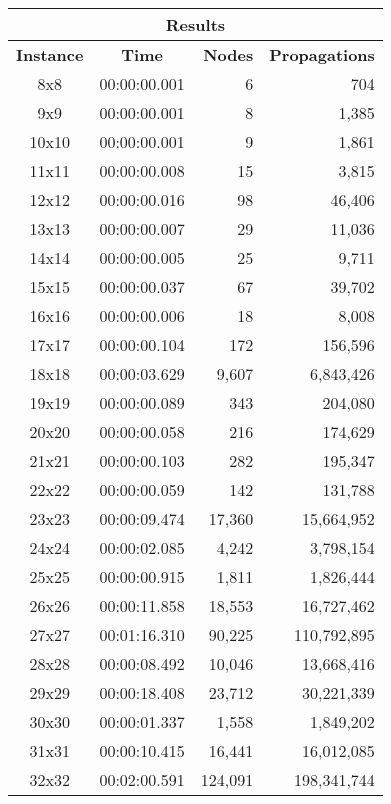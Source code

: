
\begin{center}
    \begin{tabular}{|c|c|r|r|}
        \hline
        \multicolumn{4}{|c|}{\textbf{Results}} \\
        \hline
        \textbf{Instance} & \textbf{Time} & \textbf{Nodes} & \textbf{Propagations} \\
        
        \hline
		8x8 & 00:00:00.001 & 6 & 704 \\ \hline
		9x9 & 00:00:00.001 & 8 & 1,385 \\ \hline
		10x10 & 00:00:00.001 & 9 & 1,861 \\ \hline
		11x11 & 00:00:00.008 & 15 & 3,815 \\ \hline
		12x12 & 00:00:00.016 & 98 & 46,406 \\ \hline
		13x13 & 00:00:00.007 & 29 & 11,036 \\ \hline
		14x14 & 00:00:00.005 & 25 & 9,711 \\ \hline
		15x15 & 00:00:00.037 & 67 & 39,702 \\ \hline
		16x16 & 00:00:00.006 & 18 & 8,008 \\ \hline
		17x17 & 00:00:00.104 & 172 & 156,596 \\ \hline
		18x18 & 00:00:03.629 & 9,607 & 6,843,426 \\ \hline
		19x19 & 00:00:00.089 & 343 & 204,080 \\ \hline
		20x20 & 00:00:00.058 & 216 & 174,629 \\ \hline
		21x21 & 00:00:00.103 & 282 & 195,347 \\ \hline
		22x22 & 00:00:00.059 & 142 & 131,788 \\ \hline
		23x23 & 00:00:09.474 & 17,360 & 15,664,952 \\ \hline
		24x24 & 00:00:02.085 & 4,242 & 3,798,154 \\ \hline
		25x25 & 00:00:00.915 & 1,811 & 1,826,444 \\ \hline
		26x26 & 00:00:11.858 & 18,553 & 16,727,462 \\ \hline
		27x27 & 00:01:16.310 & 90,225 & 110,792,895 \\ \hline
		28x28 & 00:00:08.492 & 10,046 & 13,668,416 \\ \hline
		29x29 & 00:00:18.408 & 23,712 & 30,221,339 \\ \hline
		30x30 & 00:00:01.337 & 1,558 & 1,849,202 \\ \hline
		31x31 & 00:00:10.415 & 16,441 & 16,012,085 \\ \hline
		32x32 & 00:02:00.591 & 124,091 & 198,341,744 \\ \hline

\end{tabular}
\end{center}
